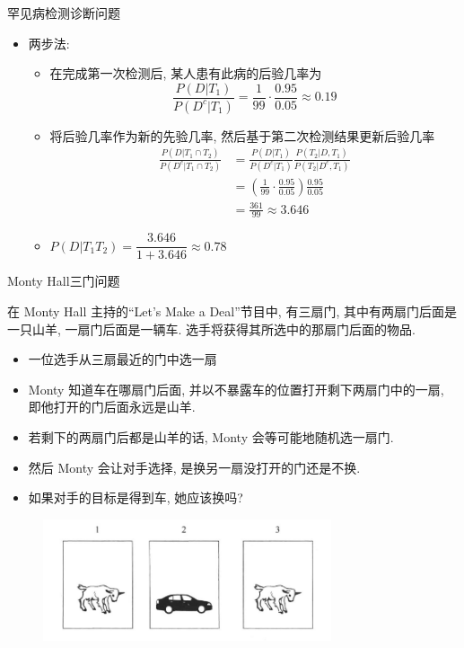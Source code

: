 \begin{frame}{罕见病检测诊断问题}
			\begin{itemize}[<+-|alert@+>]
			\item 两步法:
			\begin{itemize}[<+-|alert@+>]
			\item 在完成第一次检测后, 某人患有此病的后验几率为
             $$\frac{P(D|T_1)}{P(D^c|T_1)}=\frac{1}{99}\cdot\frac{0.95}{0.05}\approx 0.19$$
			 \item 将后验几率作为新的先验几率, 然后基于第二次检测结果更新后验几率%
			 \begin{align*}
				\frac{P(D|T_1\cap T_2)}{P(D^c|T_1\cap T_2)}
				&=\frac{P(D|T_1)}{P(D^c|T_1)}\frac{P(T_2|D,T_1)}{P(T_2|D^c,T_1)}\\
				&=(\frac{1}{99}\cdot\frac{0.95}{0.05})\frac{0.95}{0.05}\\
				&=\frac{361}{99}\approx 3.646
			 \end{align*}

			\item $P(D|T_{1}T_{2})=\dfrac{3.646}{1+3.646}\approx 0.78$
			\end{itemize}

		\end{itemize}
\end{frame}


\begin{frame}{{\rm Monty Hall}三门问题}
  \begin{exam}在 Monty Hall 主持的“Let's Make a Deal”节目中, 有三扇门, 其中有两扇门后面是一只山羊, 一扇门后面是一辆车.  选手将获得其所选中的那扇门后面的物品.
	\begin{itemize}[<+-|alert@+>]
	\item 一位选手从三扇最近的门中选一扇
	\item Monty 知道车在哪扇门后面, 并以不暴露车的位置打开剩下两扇门中的一扇, 即他打开的门后面永远是山羊.
	\item 若剩下的两扇门后都是山羊的话, Monty 会等可能地随机选一扇门.
	\item 然后 Monty 会让对手选择, 是换另一扇没打开的门还是不换.
	\item 如果对手的目标是得到车, 她应该换吗?
	\end{itemize}

    \end{exam}
    \vspace{-0.2cm}
     \begin{figure}[Monty Hall 问题.png]
      \centering
      \includegraphics[width=8.5cm]{figures/Monty Hall 问题.png}
    \end{figure}
\end{frame}


